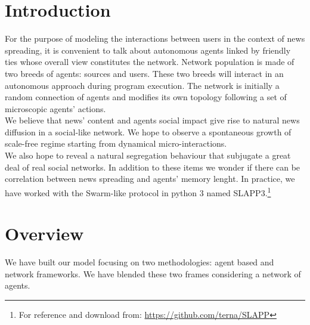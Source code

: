 \section{Introduction}\label{sec:introduction}
For the purpose of modeling the interactions between users in the
context of news spreading, it is convenient to talk about autonomous agents
linked by friendly ties whose overall view constitutes the network.
Network population is made of two breeds of agents: sources and users.
These two breeds will interact in an autonomous approach during
program execution.
The network is initially a random connection of agents and modifies
its own topology following a set of microscopic agents' actions.\\
We believe that news' content and agents social impact give rise to natural
news diffusion in a social-like network.
We hope to observe a spontaneous growth of scale-free regime starting
from dynamical micro-interactions.\\
We also hope to reveal a natural segregation behaviour that subjugate
a great deal of real social networks. In addition to these items
we wonder if there can be correlation between news spreading and agents'
memory lenght. In practice, we have worked with
the Swarm-like protocol in python 3 named SLAPP3.\footnote{For
  reference and download from: \url{https://github.com/terna/SLAPP}}

\section{Overview}\label{sec:overview}
We have built our model focusing on two methodologies:
agent based and network frameworks. We have blended these two
frames considering a network of agents. 
